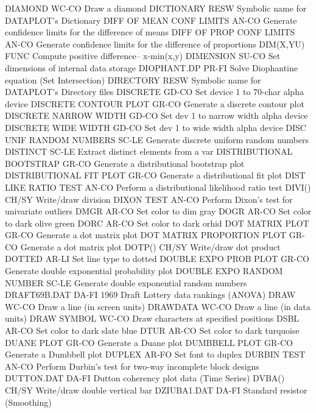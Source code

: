 DIAMOND                     WC-CO Draw a diamond
DICTIONARY                  RESW  Symbolic name for DATAPLOT's Dictionary
DIFF OF MEAN CONF LIMITS    AN-CO Generate confidence limits for the difference of means
DIFF OF PROP CONF LIMITS    AN-CO Generate confidence limits for the difference of proportions
DIM(X,YU)                   FUNC  Compute positive difference-- x-min(x,y)
DIMENSION                   SU-CO Set dimensions of internal data storage
DIOPHANT.DP                 PR-FI Solve Diophantine equation (Set Intersection)
DIRECTORY                   RESW  Symbolic name for DATAPLOT's Directory files
DISCRETE                    GD-CO Set device 1 to  70-char alpha device
DISCRETE CONTOUR PLOT       GR-CO Generate a discrete contour plot
DISCRETE NARROW WIDTH       GD-CO Set dev 1 to narrow width alpha device
DISCRETE WIDE WIDTH         GD-CO Set dev 1 to wide width alpha device
DISC UNIF RANDOM NUMBERS    SC-LE Generate discrete uniform random numbers
DISTINCT                    SC-LE Extract distinct elements from a var
DISTRIBUTIONAL BOOTSTRAP    GR-CO Generate a distributional bootstrap plot
DISTRIBUTIONAL FIT PLOT     GR-CO Generate a distributional fit plot
DIST LIKE RATIO TEST        AN-CO Perform a distributional likelihood ratio test
DIVI()                      CH/SY Write/draw division
DIXON TEST                  AN-CO Perform Dixon's test for univariate outliers
DMGR                        AR-CO Set color to dim gray
DOGR                        AR-CO Set color to dark olive green
DORC                        AR-CO Set color to dark orhid
DOT MATRIX PLOT             GR-CO Generate a dot matrix plot
DOT MATRIX PROPORTION PLOT  GR-CO Generate a dot matrix plot
DOTP()                      CH/SY Write/draw dot product
DOTTED                      AR-LI Set line type to dotted
DOUBLE EXPO PROB PLOT       GR-CO Generate double exponential probability plot
DOUBLE EXPO RANDOM NUMBER   SC-LE Generate double exponential random numbers
DRAFT69B.DAT                DA-FI 1969 Draft Lottery data rankings (ANOVA)
DRAW                        WC-CO Draw a line (in screen units)
DRAWDATA                    WC-CO Draw a line (in data units)
DRAW SYMBOL                 WC-CO Draw characters at specified positions
DSBL                        AR-CO Set color to dark slate blue
DTUR                        AR-CO Set color to dark turquoise
DUANE PLOT                  GR-CO Generate a Duane plot
DUMBBELL PLOT               GR-CO Generate a Dumbbell plot
DUPLEX                      AR-FO Set font to duplex
DURBIN TEST                 AN-CO Perform Durbin's test for two-way incomplete block designs
DUTTON.DAT                  DA-FI Dutton coherency plot data (Time Series)
DVBA()                      CH/SY Write/draw double vertical bar
DZIUBA1.DAT                 DA-FI Standard resistor (Smoothing)

